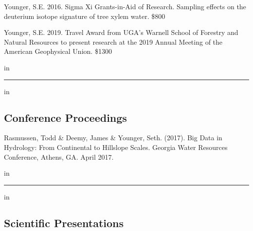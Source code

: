 \documentclass[10pt,letterpaper]{article}
\begin{document}
	\begin{hangparas}{.25in}{1}
		
		Younger, S.E. 2016. Sigma Xi Grants-in-Aid of Research. Sampling effects on the deuterium isotope signature of tree xylem water. \$800
		
		
		Younger, S.E. 2019. Travel Award from UGA's Warnell School of Forestry and Natural Resources to present research at the 2019 Annual Meeting of the American Geophysical Union. \$1300
		
		\vspace{-0.4em}
		 in
		
	\end{hangparas}
	
	\hrule
	\vspace{-0.4em}
	 in
	\subsection*{Conference Proceedings}
	
	\begin{hangparas}{.25in}{1}
		
		Rasmussen, Todd \& Deemy, James \& Younger, Seth. (2017). Big Data in Hydrology: From Continental to Hillslope Scales. Georgia Water Resources Conference, Athens, GA. April 2017.
		
	\end{hangparas}
	
	 in
	
	\begingroup
	\footnotesize
	
	\hrule
	\vspace{-0.4em}
	 in
	
	\subsection*{Scientific Presentations}
	
\end{document}
